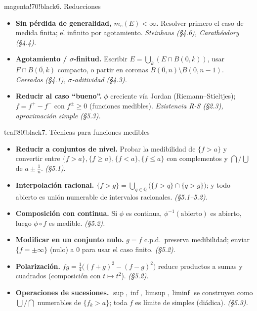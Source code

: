 \documentclass[11pt,twoside]{article}
\newcommand{\Q}{\mathbb{Q}}
\begin{document}
\begin{equivbox}{magenta!70!black}{6. Reducciones}
\begin{itemize}[leftmargin=2em,itemsep=2pt]
\item \textbf{Sin p\'erdida de generalidad, $m_{e}(E) < \infty$.} Resolver primero el caso de medida finita; el infinito por agotamiento. \hfill\textit{Steinhaus (§4.6), Carath\'eodory (§4.4).}
\item \textbf{Agotamiento / $\sigma$-finitud.} Escribir $E = \bigcup_{k}(E \cap B(0,k))$, usar $F \cap \overline{B(0,k)}$ compacto, o partir en coronas $\overline{B(0,n)} \setminus B(0,n-1)$. \hfill\textit{Cerrados (§4.1), $\sigma$-aditividad (§4.3).}
\item \textbf{Reducir al caso ``bueno''.} $\phi$ creciente v\'ia Jordan (Riemann--Stieltjes); $f = f^{+} - f^{-}$ con $f^{\pm} \geq 0$ (funciones medibles). \hfill\textit{Existencia R-S (§2.3), aproximaci\'on simple (§5.3).}
\end{itemize}
\end{equivbox}

\begin{equivbox}{teal!80!black}{7. T\'ecnicas para funciones medibles}
\begin{itemize}[leftmargin=2em,itemsep=2pt]
\item \textbf{Reducir a conjuntos de nivel.} Probar la medibilidad de $\{f > a\}$ y convertir entre $\{f > a\}, \{f \geq a\}, \{f < a\}, \{f \leq a\}$ con complementos y $\bigcap / \bigcup$ de $a \pm \tfrac{1}{n}$. \hfill\textit{(§5.1).}
\item \textbf{Interpolaci\'on racional.} $\{f > g\} = \bigcup_{q \in \Q}\big(\{f > q\} \cap \{q > g\}\big)$; y todo abierto es uni\'on numerable de intervalos racionales. \hfill\textit{(§5.1--5.2).}
\item \textbf{Composici\'on con continua.} Si $\phi$ es continua, $\phi^{-1}(\text{abierto})$ es abierto, luego $\phi \circ f$ es medible. \hfill\textit{(§5.2).}
\item \textbf{Modificar en un conjunto nulo.} $g = f$ c.p.d.\ preserva medibilidad; enviar $\{f = \pm\infty\}$ (nulo) a $0$ para usar el caso finito. \hfill\textit{(§5.2).}
\item \textbf{Polarizaci\'on.} $fg = \tfrac{1}{4}\big((f+g)^{2} - (f-g)^{2}\big)$ reduce productos a sumas y cuadrados (composici\'on con $t \mapsto t^{2}$). \hfill\textit{(§5.2).}
\item \textbf{Operaciones de sucesiones.} $\sup, \inf, \limsup, \liminf$ se construyen como $\bigcup / \bigcap$ numerables de $\{f_{k} > a\}$; toda $f$ es l\'imite de simples (di\'adica). \hfill\textit{(§5.3).}
\end{itemize}
\end{equivbox}
\end{document}
